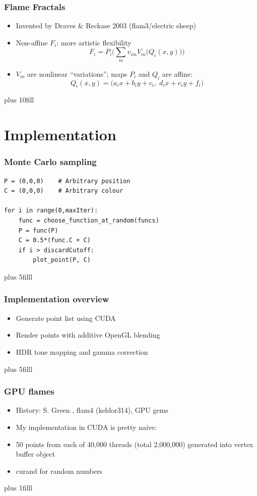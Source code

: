 \documentclass{beamer}
\newcommand{\vf}[1]{\vskip0pt plus #1}
\begin{document}
\begin{frame}
  \frametitle{Flame Fractals}
  \begin{itemize}
    \item
      Invented by Draves \& Reckase 2003 \cite{Draves2003} (flam3/electric sheep)
    \item
      Non-affine $F_i$: more artistic flexibility
      \[
      F_i = P_i\bigg(\sum_m v_{im} V_m\big(Q_i(x,y)\big)\bigg)
      \]
    \item
      $V_m$ are nonlinear ``variations''; maps $P_i$ and $Q_i$ are affine:
      \[
        Q_i(x,y) = \big(a_i x + b_i y + c_i,\; d_i x + e_i y + f_i \big)
      \]
  \end{itemize}
  \vf{10fill}
\end{frame}


\section{Implementation}

\begin{frame}[fragile]
  \frametitle{Monte Carlo sampling}
  \lstset{language=python,basicstyle=\scriptsize}
\begin{lstlisting}
P = (0,0,0)    # Arbitrary position
C = (0,0,0)    # Arbitrary colour

for i in range(0,maxIter):
    func = choose_function_at_random(funcs)
    P = func(P)
    C = 0.5*(func.C + C)
    if i > discardCutoff:
        plot_point(P, C)
\end{lstlisting}
  \vf{5filll}
\end{frame}


\begin{frame}
  \frametitle{Implementation overview}
  \begin{itemize}
    \item
      Generate point list using CUDA
    \item
      Render points with additive OpenGL blending
    \item
      HDR tone mapping and gamma correction
  \end{itemize}
  \vf{5filll}
\end{frame}


\begin{frame}
  \frametitle{GPU flames}
  \begin{itemize}
    \item
      History: S. Green \cite{Green2005}, flam4 (keldor314), GPU gems \cite{Schied2011}
    \item
      My implementation in CUDA is pretty naive:
    \item
      50 points from each of 40,000 threads (total 2,000,000) generated into 
      vertex buffer object
    \item
      curand for random numbers
  \end{itemize}
  \vf{1filll}
\end{frame}
\end{document}
